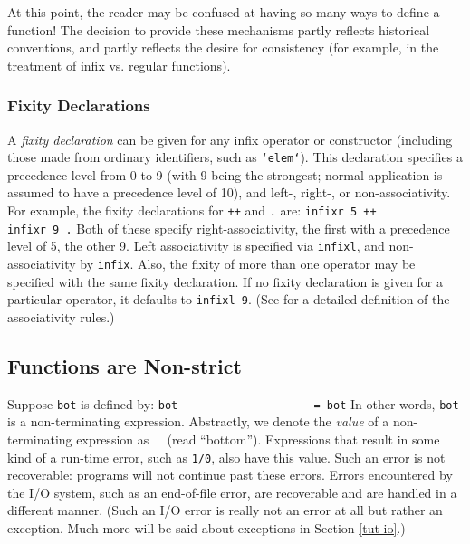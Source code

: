 
At this point, the reader may be confused at having so many ways to
define a function!  The decision to provide these mechanisms partly
reflects historical conventions, and partly reflects the desire for
consistency (for example, in the treatment of infix vs. regular
functions).


\subsubsection{Fixity Declarations}

A {\em fixity declaration} can be given for any infix operator or
constructor (including those made from ordinary identifiers, such as
\mbox{\tt `elem`}).
This declaration specifies a precedence level from
0 to 9 (with 9 being the strongest; normal application is assumed to
have a precedence level of 10), and left-, right-, or
non-associativity.  For example, the fixity declarations for \mbox{\tt ++} and
\mbox{\tt .} are:
\bprog
\mbox{\tt infixr\ 5\ ++}\\
\mbox{\tt infixr\ 9\ .}
\eprog 
Both of these specify right-associativity, the first with a precedence
level of 5, the other 9.  Left associativity is specified via
\mbox{\tt infixl}, and non-associativity by \mbox{\tt infix}.  Also, the fixity of more
than one operator may be specified with the same fixity declaration.
If no fixity declaration is given for a particular operator, it
defaults to \mbox{\tt infixl\ 9}.  (See  for a detailed definition
of the associativity rules.)

\subsection{Functions are Non-strict}
\label{tut-non-strict}

Suppose \mbox{\tt bot} is defined by:
\bprog
\mbox{\tt bot\ \ \ \ \ \ \ \ \ \ \ \ \ \ \ \ \ \ \ \ \ =\ bot}
\eprog
In other words, \mbox{\tt bot} is a non-terminating expression.  Abstractly, we
denote the {\em value} of a non-terminating expression as $\bot$ (read
``bottom'').  Expressions that result in some kind of a run-time
error, such as \mbox{\tt 1/0}, also have this value.  Such an error is not
recoverable: programs will not continue past these errors.  Errors
encountered by the I/O system, such as an end-of-file error, are
recoverable and are handled in a different manner.  (Such an I/O error
is really not an error at all but rather an exception.  Much more will
be said about exceptions in Section \ref{tut-io}.)

